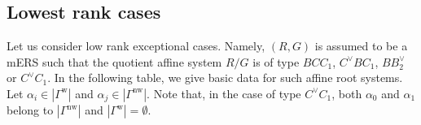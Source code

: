 \documentclass[11pt]{amsart}
\newcommand{\w}{\mathrm{w}}
\newcommand{\nw}{\mathrm{nw}}
\begin{document}
{\subsection{Lowest rank cases}
Let us consider low rank exceptional cases. Namely, $(R,G)$ is assumed to be
a mERS such that the quotient affine system $R/G$ is of type $BCC_1$, 
$C^\vee BC_1$, $BB^\vee_2$ or $C^\vee C_1$. In the following table, we give 
basic data for such affine root systems. 
Let $\alpha_i\in |\Gamma^\w|$ and $\alpha_j\in |\Gamma^\nw|$. 
Note that, in the case of type $C^\vee C_1$, both $\alpha_0$ and $\alpha_1$ 
belong to $|\Gamma^\nw|$ and $|\Gamma^\w|=\emptyset$.
\begin{center}
\begin{table}[h]
\label{table1-alpha-beta}
\vskip -1mm
\end{table}
\end{center}}
\end{document}
